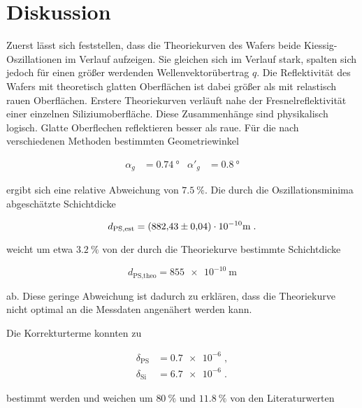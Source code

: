\section{Diskussion}
\label{sec:Diskussion}

Zuerst lässt sich feststellen, dass die Theoriekurven des Wafers beide Kiessig-Oszillationen im Verlauf aufzeigen.
Sie gleichen sich im Verlauf stark, spalten sich jedoch für einen größer werdenden Wellenvektorübertrag $q$.
Die Reflektivität des Wafers mit theoretisch glatten Oberflächen ist dabei größer als mit relastisch rauen 
Oberflächen. Erstere Theoriekurven verläuft nahe der Fresnelreflektivität einer 
einzelnen Siliziumoberfläche.
Diese Zusammenhänge sind physikalisch logisch. Glatte Oberflechen reflektieren besser als raue.
Für die nach verschiedenen Methoden bestimmten Geometriewinkel

\vspace{-10pt}
\begin{align*}
    \alpha_g &= \SI{0.74}{\degree} & \alpha'_g &= \SI{0.8}{\degree}
\end{align*}

ergibt sich eine relative Abweichung von $\SI{7.5}{\percent}$.
Die durch die Oszillationsminima abgeschätzte Schichtdicke

\vspace{-10pt}
\begin{equation*}
    d_\text{PS,est} = (\num{882.43 +- 0.04}) \cdot 10^{-10} \si{\meter} \; .
\end{equation*}

weicht um etwa $\SI{3.2}{\percent}$ von der durch die Theoriekurve bestimmte 
Schichtdicke 

\vspace{-10pt}
\begin{equation*}
    d_\text{PS,theo} = \SI{855e-10}{\meter}
\end{equation*} 

ab. Diese geringe Abweichung ist dadurch zu erklären, dass die Theoriekurve nicht
optimal an die Messdaten angenähert werden kann.

Die Korrekturterme konnten zu 

\vspace{-25pt}
\begin{align*}
    \delta_\text{PS} &= \num{0.7e-6} \; , \\
    \delta_\text{Si} &= \num{6.7e-6} \; .
\end{align*}

bestimmt werden und weichen um $\SI{80}{\percent}$ und 
$\SI{11.8}{\percent}$ von den Literaturwerten \cite{tolan}

